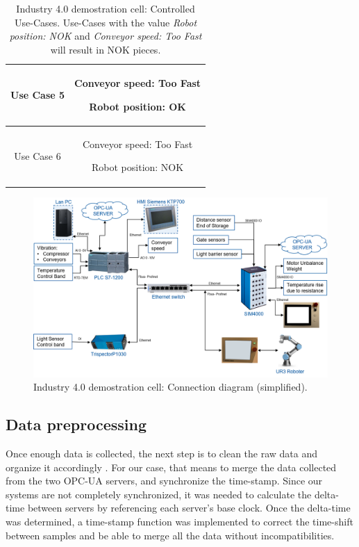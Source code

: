 \documentclass[5p,times,procedia]{elsarticle}
\begin{document}
\begin{table}
\begin{tabular}{ c c }
              Use Case 5  & \begin{minipage}[t]{0.25\textwidth}
                            \begin{description}
                                   \item Conveyor speed: Too Fast
                                   \item Robot position: OK
                            \end{description}
                            \end{minipage}  \\ \hline
              Use Case 6  & \begin{minipage}[t]{0.25\textwidth}
                            \begin{description}
                                   \item Conveyor speed: Too Fast
                                   \item Robot position: NOK
                            \end{description}
                            \end{minipage}  \\ \bottomrule
       \end{tabular}
       \caption{Industry 4.0 demostration cell: Controlled Use-Cases.
       Use-Cases with the value \textit{Robot position: NOK} and \textit{Conveyor speed: Too Fast} will result in NOK pieces.}
       \label{tab:use_cases}
\end{table}


\begin{figure}
       \includegraphics[width=.45\textwidth]{img/demozelle_conex_diagram.png}
       \caption{Industry 4.0 demostration cell: Connection diagram (simplified).
             }
\label{fig:demo_conn_diag}
\end{figure}

\subsection{Data preprocessing}

Once enough data is collected, the next step is to clean the raw data and organize it accordingly \cite{goodfellow2016deep}. For our case, that means to merge the data collected from the two OPC-UA servers, and synchronize the time-stamp. Since our systems are not completely synchronized, it was needed to calculate the delta-time between servers by referencing each server's base clock. Once the delta-time was determined, a time-stamp function was implemented to correct the time-shift between samples and be able to merge all the data without incompatibilities.
\end{document}
